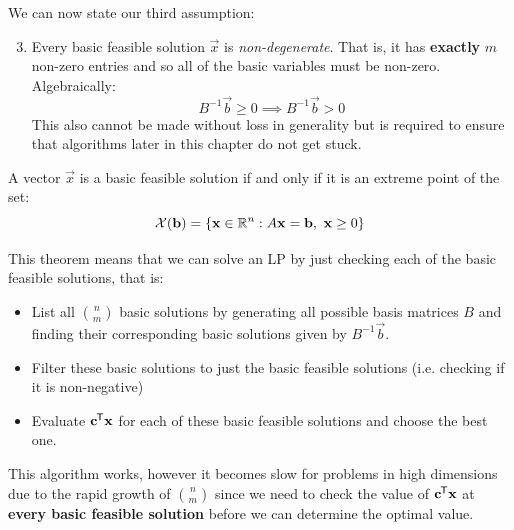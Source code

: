 \documentclass[../main.tex]{subfiles}
\begin{document}
We can now state our third assumption:
\begin{enumerate}
  \setcounter{enumi}{2}
  \item Every basic feasible solution $\vec{x}$ is \textit{non-degenerate}.
    That is, it has \textbf{exactly} $m$ non-zero entries and so all of the basic variables must be non-zero.
    Algebraically:
    \[
      B^{-1} \vec{b} \geq 0 \implies B^{-1} \vec{b} > 0
    \]
    This also cannot be made without loss in generality but is required to ensure that algorithms later in this chapter do not get stuck.
\end{enumerate}
\begin{theorem}
  A vector $\vec{x}$ is a basic feasible solution if and only if it is an extreme point of the set:
  \[
    \mathcal{X}(\mathbf{\bm{b}}) = \{\mathbf{\bm{x}} \in \mathbb{R}^{n}: A \mathbf{\bm{x}} = \mathbf{\bm{b}},\ \mathbf{\bm{x}} \geq 0\}
  \]
\end{theorem}
\begin{remark}
  This theorem means that we can solve an LP by just checking each of the basic feasible solutions, that is: \label{rudimentaryAlgorithm}
  \begin{itemize}
    \item List all $\binom{n}{m}$ basic solutions by generating all possible basis matrices $B$ and finding their corresponding basic solutions given by $B^{-1}\vec{b}$.
    \item Filter these basic solutions to just the basic feasible solutions (i.e. checking if it is non-negative)
    \item Evaluate $\mathbf{\bm{c}}^{{\mkern-1.5mu\mathsf{T}}} \mathbf{\bm{x}}$ for each of these basic feasible solutions and choose the best one.
  \end{itemize}
  This algorithm works, however it becomes slow for problems in high dimensions due to the rapid growth of $\binom{n}{m}$ since we need to check the value of $\mathbf{\bm{c}}^{{\mkern-1.5mu\mathsf{T}}} \mathbf{\bm{x}}$ at \textbf{every basic feasible solution} before we can determine the optimal value.
\end{remark}
\end{document}
